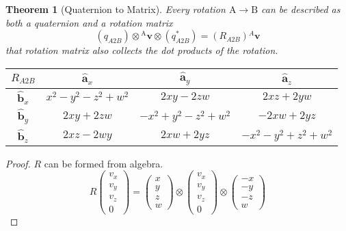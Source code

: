 \documentclass{amsart}
\newtheorem{theorem}{Theorem}[section]
\theoremstyle{definition}
\theoremstyle{remark}
\numberwithin{equation}{section}
\begin{document}
\begin{theorem}[Quaternion to Matrix]
  Every rotation $\mathrm{A}\to\mathrm{B}$ can be described as both a quaternion and a rotation matrix
  \begin{equation}
    \left({q_{A2B}}\right) \otimes {^\mathrm{A}\mathbf{v}} \otimes \left({q^*_{A2B}}\right) = \left({R_{A2B}}\right){^A\mathbf{v}}
  \end{equation}
  that rotation matrix also collects the dot products of the rotation.
  
  \begin{tabular}{c|ccc}
    $R_{A2B}$ & $\hat{\mathbf{a}}_x$ & $\hat{\mathbf{a}}_y$ & $\hat{\mathbf{a}}_z$ \\
    \hline
    $\hat{\mathbf{b}}_x$ & $x^2-y^2-z^2+w^2$ & $2xy-2zw$ & $2xz+2yw$ \\
    $\hat{\mathbf{b}}_y$ & $2xy+2zw$ & $-x^2+y^2-z^2+w^2$ & $-2xw+2yz$ \\
    $\hat{\mathbf{b}}_z$ & $2xz-2wy$ & $2xw+2yz$ & $-x^2-y^2+z^2+w^2$
  \end{tabular}\centering
\end{theorem}
\begin{proof}
  $R$ can be formed from algebra.
  \begin{equation}
    R
    \begin{pmatrix}
      v_x \\
      v_y \\
      v_z \\
      0
    \end{pmatrix}
    =
    \begin{pmatrix}
      x \\
      y \\
      z \\
      w
    \end{pmatrix} \otimes
    \begin{pmatrix}
      v_x \\
      v_y \\
      v_z \\
      0
    \end{pmatrix}
    \otimes
    \begin{pmatrix}
      -x \\
      -y \\
      -z \\
      w
    \end{pmatrix}
  \end{equation}
\end{proof}
\end{document}
